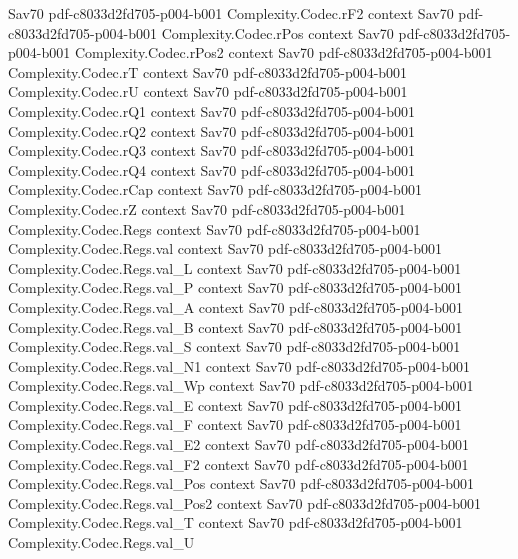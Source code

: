 \begin{theorem}
  {Sav70}
  {pdf-c8033d2fd705-p004-b001}
\proofstep
  {Complexity.Codec.rF2}
  {context}
  {Sav70}
  {pdf-c8033d2fd705-p004-b001}
\proofstep
  {Complexity.Codec.rPos}
  {context}
  {Sav70}
  {pdf-c8033d2fd705-p004-b001}
\proofstep
  {Complexity.Codec.rPos2}
  {context}
  {Sav70}
  {pdf-c8033d2fd705-p004-b001}
\proofstep
  {Complexity.Codec.rT}
  {context}
  {Sav70}
  {pdf-c8033d2fd705-p004-b001}
\proofstep
  {Complexity.Codec.rU}
  {context}
  {Sav70}
  {pdf-c8033d2fd705-p004-b001}
\proofstep
  {Complexity.Codec.rQ1}
  {context}
  {Sav70}
  {pdf-c8033d2fd705-p004-b001}
\proofstep
  {Complexity.Codec.rQ2}
  {context}
  {Sav70}
  {pdf-c8033d2fd705-p004-b001}
\proofstep
  {Complexity.Codec.rQ3}
  {context}
  {Sav70}
  {pdf-c8033d2fd705-p004-b001}
\proofstep
  {Complexity.Codec.rQ4}
  {context}
  {Sav70}
  {pdf-c8033d2fd705-p004-b001}
\proofstep
  {Complexity.Codec.rCap}
  {context}
  {Sav70}
  {pdf-c8033d2fd705-p004-b001}
\proofstep
  {Complexity.Codec.rZ}
  {context}
  {Sav70}
  {pdf-c8033d2fd705-p004-b001}
\proofstep
  {Complexity.Codec.Regs}
  {context}
  {Sav70}
  {pdf-c8033d2fd705-p004-b001}
\proofstep
  {Complexity.Codec.Regs.val}
  {context}
  {Sav70}
  {pdf-c8033d2fd705-p004-b001}
\proofstep
  {Complexity.Codec.Regs.val_L}
  {context}
  {Sav70}
  {pdf-c8033d2fd705-p004-b001}
\proofstep
  {Complexity.Codec.Regs.val_P}
  {context}
  {Sav70}
  {pdf-c8033d2fd705-p004-b001}
\proofstep
  {Complexity.Codec.Regs.val_A}
  {context}
  {Sav70}
  {pdf-c8033d2fd705-p004-b001}
\proofstep
  {Complexity.Codec.Regs.val_B}
  {context}
  {Sav70}
  {pdf-c8033d2fd705-p004-b001}
\proofstep
  {Complexity.Codec.Regs.val_S}
  {context}
  {Sav70}
  {pdf-c8033d2fd705-p004-b001}
\proofstep
  {Complexity.Codec.Regs.val_N1}
  {context}
  {Sav70}
  {pdf-c8033d2fd705-p004-b001}
\proofstep
  {Complexity.Codec.Regs.val_Wp}
  {context}
  {Sav70}
  {pdf-c8033d2fd705-p004-b001}
\proofstep
  {Complexity.Codec.Regs.val_E}
  {context}
  {Sav70}
  {pdf-c8033d2fd705-p004-b001}
\proofstep
  {Complexity.Codec.Regs.val_F}
  {context}
  {Sav70}
  {pdf-c8033d2fd705-p004-b001}
\proofstep
  {Complexity.Codec.Regs.val_E2}
  {context}
  {Sav70}
  {pdf-c8033d2fd705-p004-b001}
\proofstep
  {Complexity.Codec.Regs.val_F2}
  {context}
  {Sav70}
  {pdf-c8033d2fd705-p004-b001}
\proofstep
  {Complexity.Codec.Regs.val_Pos}
  {context}
  {Sav70}
  {pdf-c8033d2fd705-p004-b001}
\proofstep
  {Complexity.Codec.Regs.val_Pos2}
  {context}
  {Sav70}
  {pdf-c8033d2fd705-p004-b001}
\proofstep
  {Complexity.Codec.Regs.val_T}
  {context}
  {Sav70}
  {pdf-c8033d2fd705-p004-b001}
\proofstep
  {Complexity.Codec.Regs.val_U}

\end{theorem}
